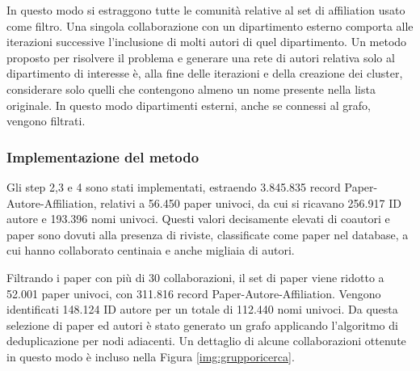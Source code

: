 \documentclass[12pt,a4paper,twoside]{report}
\begin{document}
In questo modo si estraggono tutte le comunità relative al set di affiliation usato come filtro. Una
singola collaborazione con un dipartimento esterno comporta alle iterazioni successive l'inclusione
di molti autori di quel dipartimento. Un metodo proposto per risolvere il problema e generare una
rete di autori relativa solo al dipartimento di interesse è, alla fine delle iterazioni e della
creazione dei cluster, considerare solo quelli che contengono almeno un nome presente nella lista
originale. In questo modo dipartimenti esterni, anche se connessi al grafo, vengono filtrati.

\subsubsection{Implementazione del metodo}

Gli step 2,3 e 4 sono stati implementati, estraendo 3.845.835 record Paper-Autore-Affiliation,
relativi a 56.450 paper univoci, da cui si ricavano 256.917 ID autore e 193.396 nomi univoci. Questi
valori decisamente elevati di coautori e paper sono dovuti alla presenza di riviste, classificate come
paper nel database, a cui hanno collaborato centinaia e anche migliaia di autori.

Filtrando i paper con più di 30 collaborazioni, il set di paper viene ridotto a 52.001 paper
univoci, con 311.816 record Paper-Autore-Affiliation. Vengono identificati 148.124 ID autore per un
totale di 112.440 nomi univoci. Da questa selezione di paper ed autori è stato generato un grafo
applicando l'algoritmo di deduplicazione per nodi adiacenti. Un dettaglio di alcune collaborazioni
ottenute in questo modo è incluso nella Figura \ref{img:grupporicerca}.
\end{document}
